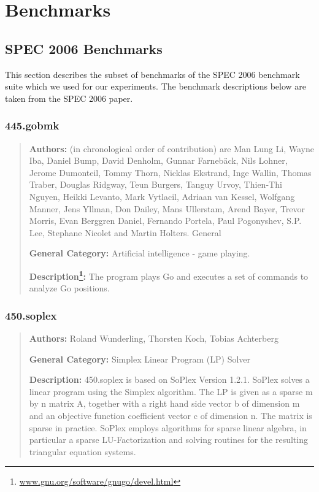 \documentclass[onecolumn, openany, master, english, seal, signatures]{dbrgrptt}
\begin{document}
\section{Benchmarks}

\subsection{SPEC 2006 Benchmarks}

This section describes the subset of benchmarks of the SPEC 2006 benchmark suite \cite{henning2006spec} which we used for our experiments. The benchmark descriptions below are taken from the SPEC 2006 paper.

\subsubsection{445.gobmk}

\begin{quote}
\textbf{Authors:} (in chronological order of contribution) are Man Lung Li, Wayne Iba, Daniel Bump, David Denholm, Gunnar Farneb\"ack, Nils Lohner, Jerome Dumonteil, Tommy Thorn, Nicklas Ekstrand, Inge Wallin, Thomas Traber, Douglas Ridgway, Teun Burgers, Tanguy Urvoy, Thien-Thi Nguyen, Heikki Levanto, Mark Vytlacil, Adriaan van Kessel, Wolfgang Manner, Jens Yllman, Don Dailey, Mans Ullerstam, Arend Bayer, Trevor Morris, Evan Berggren Daniel, Fernando Portela, Paul Pogonyshev, S.P. Lee, Stephane Nicolet and Martin Holters. General

\textbf{General Category:} Artificial intelligence - game playing.

\textbf{Description\footnote{\url{www.gnu.org/software/gnugo/devel.html}}:} The program plays Go and executes a set of commands to analyze Go positions.
\end{quote}

\subsubsection{450.soplex}

\begin{quote}
\textbf{Authors:} Roland Wunderling, Thorsten Koch, Tobias Achterberg

\textbf{General Category:} Simplex Linear Program (LP) Solver

\textbf{Description:} 450.soplex is based on SoPlex Version 1.2.1. SoPlex solves a linear program using the Simplex algorithm. The LP is given as a sparse m by n matrix A, together with a right hand side vector b of dimension m and an objective function coefficient vector c of dimension n. The matrix is sparse in practice. SoPlex employs algorithms for sparse linear algebra, in particular a sparse LU-Factorization and solving routines for the resulting triangular equation systems.
\end{quote}
\end{document}

